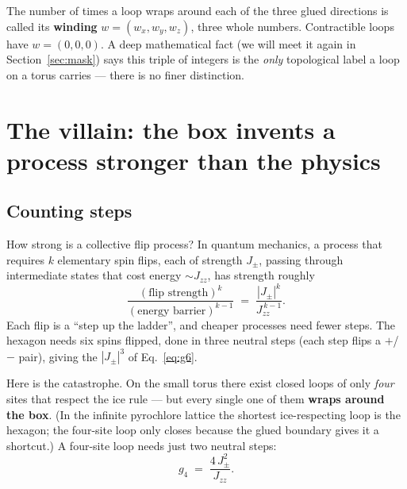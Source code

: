 \documentclass[11pt,a4paper]{article}
\newcommand{\Jpm}{J_{\pm}}
\newcommand{\Jzz}{J_{zz}}
\newcommand{\gfour}{g_4}
\begin{document}
The number of times a loop wraps around each of the three glued directions is
called its \textbf{winding} $w=(w_x,w_y,w_z)$, three whole numbers.
Contractible loops have $w=(0,0,0)$.  A deep mathematical fact (we will meet
it again in Section~\ref{sec:mask}) says this triple of integers is the
\emph{only} topological label a loop on a torus carries --- there is no finer
distinction.

\section{The villain: the box invents a process stronger than the physics}
\label{sec:villain}

\subsection{Counting steps}

How strong is a collective flip process?  In quantum mechanics, a process
that requires $k$ elementary spin flips, each of strength $\Jpm$, passing
through intermediate states that cost energy $\sim\Jzz$, has strength roughly
\[
\frac{(\text{flip strength})^{k}}{(\text{energy barrier})^{k-1}}
\;=\;\frac{|\Jpm|^{k}}{\Jzz^{\,k-1}} .
\]
Each flip is a ``step up the ladder'', and cheaper processes need fewer
steps.  The hexagon needs six spins flipped, done in three neutral steps
(each step flips a $+$/$-$ pair), giving the $|\Jpm|^3$ of
Eq.~\eqref{eq:g6}.

Here is the catastrophe.  On the small torus there exist closed loops of only
\emph{four} sites that respect the ice rule --- but every single one of them
\textbf{wraps around the box}.  (In the infinite pyrochlore lattice the
shortest ice-respecting loop is the hexagon; the four-site loop only closes
because the glued boundary gives it a shortcut.)  A four-site loop needs just
two neutral steps:
\begin{equation}
\gfour \;=\; \frac{4\,\Jpm^{2}}{\Jzz}.
\label{eq:g4}
\end{equation}
\end{document}
